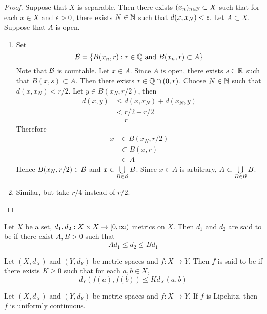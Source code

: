 \documentclass{book}
\begin{document}
\begin{proof}
	Suppose that $X$ is separable. Then there exists $(x_n)_{n \in \mathbb{N}} \subset X$ such that for each $x \in X$ and $\epsilon >0$, there exists $N \in \mathbb{N}$ such that $d(x, x_N) < \epsilon$. Let $A \subset X$. Suppose that $A$ is open.
	\begin{enumerate}
		\item  Set 
		$$\mathcal{B} = \{B(x_n, r): r \in \mathbb{Q} \text{ and } B(x_n, r) \subset A\}$$ 
		Note that $\mathcal{B}$ is countable. Let $x \in A$. Since $A$ is open, there exists $s \in \mathbb{R}$ such that $B(x, s) \subset A$. Then there exists  $r \in \mathbb{Q} \cap (0, r)$. Choose $N \in \mathbb{N}$ such that $d(x, x_N) < r/2$. Let $y \in B(x_N, r/2)$, then 
		\begin{align*}
			d(x, y) 
			& \leq d(x, x_N) + d(x_N, y) \\
			& < r/2 + r/2 \\
			& = r
		\end{align*}
		Therefore 
		\begin{align*}
			x 
			& \in B(x_N, r/2) \\
			& \subset B(x, r) \\
			& \subset A
		\end{align*}
		Hence $B(x_N, r/2) \in \mathcal{B}$ and $x \in \bigcup\limits_{B \in \mathcal{B}}B$. Since $x \in A$ is arbitrary, $A \subset \bigcup\limits_{B \in \mathcal{B}}B$.
		\item Similar, but take $r/4$ instead of $r/2$.
	\end{enumerate}
\end{proof}

\begin{defn} \ld{}
	Let $X$ be a set, $d_1, d_2: X \times X \rightarrow [0,\infty)$ metrics on $X$. Then $d_1$ and $d_2$ are said to be  if there exist $A, B > 0$ such that $$A d_1 \leq d_2 \leq B d_1$$		
\end{defn}	

\begin{defn} \ld{}
	Let $(X, d_X)$ and $(Y, d_Y)$ be metric spaces and $f: X \rightarrow Y$. Then $f$ is said to be  if there exists $K \geq 0$ such that for each $a, b \in X$, $$d_Y(f(a), f(b)) \leq Kd_X(a,b)$$
\end{defn}	

\begin{ex} \lex{}
	Let $(X, d_X)$ and $(Y, d_Y)$ be metric spaces and $f: X \rightarrow Y$. If $f$ is Lipchitz, then $f$ is uniformly continuous.	
\end{ex}
\end{document}

